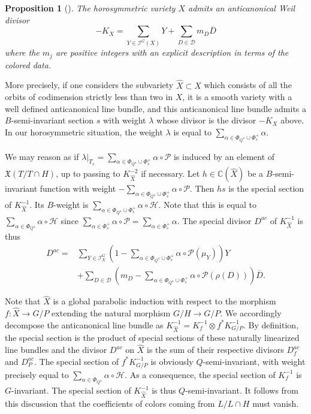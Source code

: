 \documentclass{amsart}
\newtheorem{prop}[thm]{Proposition}
\theoremstyle{definition}
\begin{document}
\begin{prop}[{\cite[Sections 4.1 and 4.2]{Bri97}}]
\label{prop_Brion_anticanonical}
The horosymmetric variety $X$ admits an anticanonical Weil divisor 
\[
-K_X=\sum_{Y\in \mathcal{I}^G(X)}Y+\sum_{D\in\mathcal{D}}m_D\overline{D}
\]
where the $m_j$ are positive integers with an explicit description in terms 
of the colored data.
\end{prop}

More precisely, if one considers the subvariety $\hat{X}\subset X$ which 
consists of all the orbits of codimension strictly less than two in $X$, 
it is a smooth variety with a well defined anticanonical line bundle, 
and this anticanonical line bundle admits a $B$-semi-invariant section $s$ 
with weight $\lambda$ whose divisor is the divisor $-K_X$ above.
In our horosymmetric situation, the weight $\lambda$ is equal to 
$\sum_{\alpha\in \Phi_{Q^u}\cup \Phi_s^+} \alpha$.

We may reason as if $\lambda|_{T_s}=\sum_{\alpha\in \Phi_{Q^u}\cup \Phi_s^+} \alpha\circ \mathcal{P}$ 
is induced by an element of $\mathfrak{X}(T/T\cap H)$, up to passing 
to $K_{\hat{X}}^{-2}$ if necessary. 
Let $h\in \mathbb{C}(\hat{X})$ be a $B$-semi-invariant function with 
weight $-\sum_{\alpha\in \Phi_{Q^u}\cup \Phi_s^+} \alpha\circ\mathcal{P}$. Then 
$hs$ is the special section of $K_{\hat{X}}^{-1}$. 
Its $B$-weight is 
$\sum_{\alpha\in \Phi_{Q^u}\cup \Phi_s^+}\alpha\circ\mathcal{H}$.
Note that this is equal to $\sum_{\alpha\in \Phi_{Q^u}}\alpha\circ\mathcal{H}$
since $\sum_{\alpha\in \Phi_s^+} \alpha\circ\mathcal{P}=\sum_{\alpha\in \Phi_s^+} \alpha$.
The special divisor $D^{ac}$ of $K_{\hat{X}}^{-1}$ is thus  
\begin{align*}
D^{ac}= &  \sum_{Y\in \mathcal{I}_X^G}\left(1-\sum_{\alpha\in \Phi_{Q^u}\cup \Phi_s^+}\alpha\circ\mathcal{P}(\mu_Y)\right)Y \\
& +\sum_{D\in\mathcal{D}}\left(m_D-\sum_{\alpha\in \Phi_{Q^u}\cup \Phi_s^+}\alpha\circ\mathcal{P}(\rho(D))\right)\overline{D}.
\end{align*}

Note that $\hat{X}$ is a global parabolic induction with respect to the 
morphism $f:\hat{X}\rightarrow G/P$ extending the natural morphism $G/H\rightarrow G/P$. 
We accordingly decompose
the anticanonical line bundle as 
$K_{\hat{X}}^{-1}=K_f^{-1}\otimes f^*K_{G/P}^{-1}$.
By definition, the special section is the product of special sections of these
naturally linearized line bundles and the divisor $D^{ac}$ on $\hat{X}$ is the sum of 
their respective divisors $D^{ac}_f$ and $D^{ac}_P$. 
The special section of $f^*K_{G/P}^{-1}$ is obviously $Q$-semi-invariant, with weight 
precisely equal to $\sum_{\alpha\in \Phi_{Q^u}}\alpha\circ\mathcal{H}$. 
As a consequence, the special section of $K_f^{-1}$ is $G$-invariant.
The special section of $K_{\hat{X}}^{-1}$ is thus $Q$-semi-invariant.
It follows from this discussion that the coefficients of colors coming 
from $L/L\cap H$ must vanish. 
\end{document}
